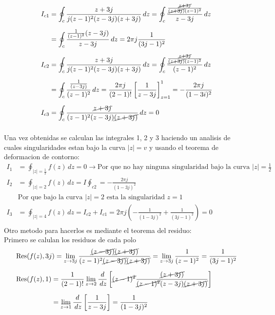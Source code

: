 \documentclass[12pt]{report}
\begin{document}
\begin{align*}
I_{c1} &= \oint_{c}\frac{z+3j}{j(z - 1)^2(z-3j)(z+3j)} \, dz =\oint_{c}\frac{\frac{\cancel{z+3j}}{\cancel{(z+3j)}(z-1)^2}}{z-3j} \, dz\\[6pt]
&= \oint_{c}\frac{\frac{1}{(z-1)^2}(z-3j)}{z-3j} \, dz = 2\pi j \frac{1}{(3j-1)^2}\\[6pt]
I_{c2} &= \oint_{c}\frac{z+3j}{j(z - 1)^2(z-3j)(z+3j)} \, dz =\oint_{c}\frac{\frac{\cancel{z+3j}}{\cancel{(z+3j)}(z-1)^2}}{(z-1)^2} \, dz\\[6pt]
&= \oint_{c}\frac{\frac{1}{(z-3j)}}{(z-1)^2} \, dz = \frac{2\pi j}{(2-1)!} \left[ \frac{1}{z-3j} \right]_{z=1}^1= -\frac{2\pi j}{(1-3i)^2} \\[6pt]
I_{c3} &= \oint_{c}\frac{\cancel{z+3j}}{(z - 1)^2(z-3j)\cancel{(z+3j)}} \, dz=0 \\[6pt]
\end{align*}

Una vez obtenidas se calculan las integrales 1, 2 y 3 haciendo un analisis de cuales singularidades estan bajo la curva $|z|=v$ y usando el teorema de deformacion de contorno: \\

\begin{align*}
I_1&=\oint_{|z|=\frac{1}{2}}f(z) \, dz= 0 \rightarrow \text{Por que no hay ninguna singularidad bajo la curva $|z|=\frac{1}{2}$}\\[6pt]
I_2&=\oint_{|z|=2}f(z) \, dz = I \oint_{c2} = - \frac{2 \pi j}{(1-3j)^2}\\[6pt]
&\text{Por que bajo la curva $|z|=2$ esta la singularidad $z=1$}\\[12pt]
I_3&= \oint_{|z|=4}f(z) \, dz = I_{c2}+I_{c1}=2 \pi j \left( -\frac{1}{(1-3j)^2} + \frac{1}{(3j-1)^2} \right) = 0 \\[6pt]
\end{align*}
Otro metodo para hacerlos es mediante el teorema del residuo:\\
Primero se calulan los residuos de cada polo\\
\begin{align*}
&\text{Res}(f(z),3j)= \lim_{z \to 3j} \frac{\cancel{(z-3j)}\cancel{(z+3j)}}{(z-1)^2\cancel{(z-3j)}\cancel{(z+3j)}}= \lim_{z \to 3j} \frac{1}{(z-1)^2}=\frac{1}{(3j-1)^2} \\[6pt]
&\text{Res}(f(z),1)=\frac{1}{(2-1)!} \lim_{z \to 2} \frac{d}{\,dz} \left[ \cancel{(z-1)^2} \frac{\cancel{(z+3j)}}{\cancel{(z-1)^2}(z-3j) \cancel{(z+3j)}} \right]\\[6pt]
&\phantom{\text{Res}(f(z),1)}= \lim_{z \to 1} \frac{d}{\,dz} \left[ \frac{1}{z-3j} \right]= \frac{1}{(1-3j)^2}\\[6pt]
\end{align*}
\end{document}
